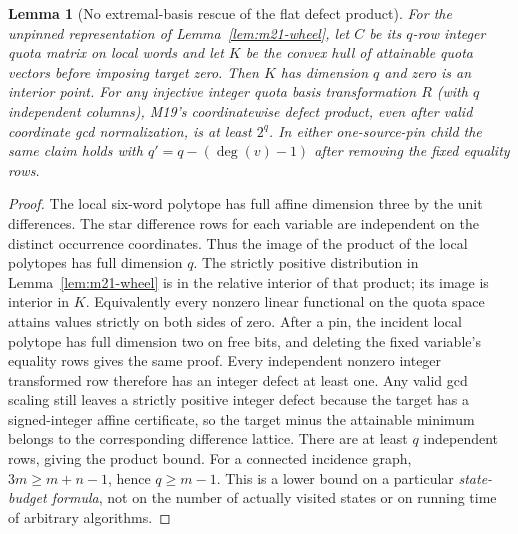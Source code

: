 \documentclass[11pt]{article}
\newtheorem{lemma}[theorem]{Lemma}
\begin{document}
\begin{lemma}[No extremal-basis rescue of the flat defect product]\label{lem:m21-defect}
For the unpinned representation of Lemma~\ref{lem:m21-wheel}, let $C$ be its $q$-row integer quota matrix on local words and let $K$ be the convex hull of attainable quota vectors before imposing target zero. Then $K$ has dimension $q$ and zero is an interior point. For any injective integer quota basis transformation $R$ (with $q$ independent columns), M19's coordinatewise defect product, even after valid coordinate gcd normalization, is at least $2^q$. In either one-source-pin child the same claim holds with $q'=q-(\deg(v)-1)$ after removing the fixed equality rows.
\end{lemma}
\begin{proof}
The local six-word polytope has full affine dimension three by the unit differences. The star difference rows for each variable are independent on the distinct occurrence coordinates. Thus the image of the product of the local polytopes has full dimension $q$. The strictly positive distribution in Lemma~\ref{lem:m21-wheel} is in the relative interior of that product; its image is interior in $K$. Equivalently every nonzero linear functional on the quota space attains values strictly on both sides of zero. After a pin, the incident local polytope has full dimension two on free bits, and deleting the fixed variable's equality rows gives the same proof. Every independent nonzero integer transformed row therefore has an integer defect at least one. Any valid gcd scaling still leaves a strictly positive integer defect because the target has a signed-integer affine certificate, so the target minus the attainable minimum belongs to the corresponding difference lattice. There are at least $q$ independent rows, giving the product bound. For a connected incidence graph, $3m\ge m+n-1$, hence $q\ge m-1$. This is a lower bound on a particular \emph{state-budget formula}, not on the number of actually visited states or on running time of arbitrary algorithms.
\end{proof}
\end{document}
